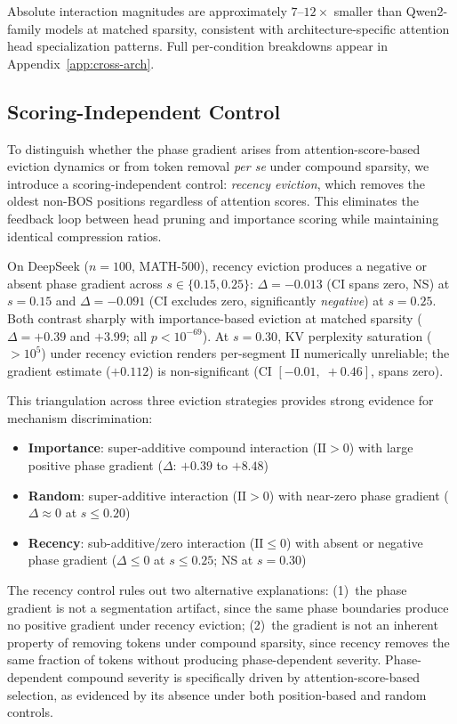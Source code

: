 Absolute interaction magnitudes are approximately $7$--$12{\times}$ smaller than Qwen2-family models at matched sparsity, consistent with architecture-specific attention head specialization patterns. Full per-condition breakdowns appear in Appendix~\ref{app:cross-arch}.

\subsection{Scoring-Independent Control}
\label{sec:scoring-control}

To distinguish whether the phase gradient arises from attention-score-based eviction dynamics or from token removal \emph{per se} under compound sparsity, we introduce a scoring-independent control: \emph{recency eviction}, which removes the oldest non-BOS positions regardless of attention scores. This eliminates the feedback loop between head pruning and importance scoring while maintaining identical compression ratios.

On DeepSeek ($n{=}100$, MATH-500), recency eviction produces a negative or absent phase gradient across $s \in \{0.15, 0.25\}$: $\Delta{=}-0.013$ (CI spans zero, NS) at $s{=}0.15$ and $\Delta{=}-0.091$ (CI excludes zero, significantly \emph{negative}) at $s{=}0.25$. Both contrast sharply with importance-based eviction at matched sparsity ($\Delta{=}+0.39$ and $+3.99$; all $p < 10^{-69}$). At $s{=}0.30$, KV perplexity saturation (${>}10^5$) under recency eviction renders per-segment II numerically unreliable; the gradient estimate ($+0.112$) is non-significant (CI $[-0.01,\; +0.46]$, spans zero).

This triangulation across three eviction strategies provides strong evidence for mechanism discrimination:
\begin{itemize}[nosep,leftmargin=*]
    \item \textbf{Importance}: super-additive compound interaction ($\mathrm{II} > 0$) with large positive phase gradient ($\Delta$: $+0.39$ to $+8.48$)
    \item \textbf{Random}: super-additive interaction ($\mathrm{II} > 0$) with near-zero phase gradient ($\Delta \approx 0$ at $s \leq 0.20$)
    \item \textbf{Recency}: sub-additive/zero interaction ($\mathrm{II} \leq 0$) with absent or negative phase gradient ($\Delta \leq 0$ at $s \leq 0.25$; NS at $s{=}0.30$)
\end{itemize}
The recency control rules out two alternative explanations: (1)~the phase gradient is not a segmentation artifact, since the same phase boundaries produce no positive gradient under recency eviction; (2)~the gradient is not an inherent property of removing tokens under compound sparsity, since recency removes the same fraction of tokens without producing phase-dependent severity. Phase-dependent compound severity is specifically driven by attention-score-based selection, as evidenced by its absence under both position-based and random controls.

